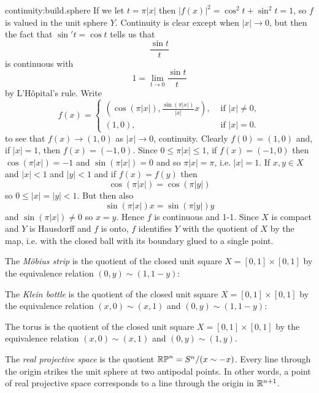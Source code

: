 \begin{answer}{continuity:build.sphere}
  If we let \(t=\pi |x|\) then \(|f(x)|^2=\cos^2 t + \sin^2 t=1\), so \(f\) is valued in the unit sphere \(Y\).
  Continuity is clear except when \(|x| \to 0\), but then the fact that \(\sin' t=\cos t\) tells us that
  \[
  \frac{\sin t}{t} 
  \]
  is continuous with
  \[
  1 = \lim_{t \to 0} \frac{\sin t}{t}
  \]
  by L'Hôpital's rule.
  Write
\[
f(x)=
\begin{cases}
\left(\cos(\pi |x|), \frac{\sin(\pi |x|)}{|x|}x\right), & \text{ if \(|x|\ne 0\)}, \\
(1,0), & \text{ if \(|x|=0\).}
\end{cases}
\]
to see that \(f(x) \to (1,0)\) as \(|x| \to 0\), continuity.
  Clearly \(f(0)=(1,0)\) and, if \(|x|=1\), then \(f(x)=(-1,0)\).
  Since \(0 \le \pi|x| \le 1\),  if \(f(x)=(-1,0)\) then \(\cos(\pi|x|)=-1\) and \(\sin(\pi|x|)=0\) and so \(\pi|x|=\pi\), i.e. \(|x|=1\).
  If \(x, y \in X\) and \(|x|<1\) and \(|y|<1\) and if \(f(x)=f(y)\) then
  \[
  \cos(\pi|x|)=\cos(\pi|y|)
  \]
  so \(0\le |x|=|y| < 1\).
  But then also
  \[
  \sin(\pi|x|)x=\sin(\pi|y|)y
  \]
  and \(\sin(\pi|x|) \ne 0\) so \(x=y\).
  Hence \(f\) is continuous and 1-1.
  Since \(X\) is compact and \(Y\) is Hausdorff and \(f\) is onto, \(f\) identifies \(Y\) with the quotient of \(X\) by the map, i.e. with the closed ball with its boundary glued to a single point.
\end{answer}
\begin{exampleAndImage}{1cm}
The \emph{M\"obius strip} is the quotient of the closed unit square \(X=[0,1] \times [0,1]\) by the equivalence relation \((0,y)\sim(1,1-y)\):
\tcblower

\end{exampleAndImage}
\begin{exampleAndImage}{1cm}
The \emph{Klein bottle} is the quotient of the closed unit square \(X=[0,1] \times [0,1]\) by the equivalence relation \((x,0)\sim(x,1)\) and \((0,y)\sim(1,1-y)\):
\tcblower

\end{exampleAndImage}
\begin{exampleAndImage}{1cm}
The torus is the quotient of the closed unit square \(X=[0,1] \times [0,1]\) by the equivalence relation \((x,0)\sim(x,1)\) and \((0,y)\sim(1,y)\).
\tcblower

\end{exampleAndImage}
\begin{example}
The \emph{real projective space} is the quotient \(\mathbb{RP}^{n}=S^n/(x \sim -x)\).
Every line through the origin strikes the unit sphere at two antipodal points.
In other words, a point of real projective space corresponds to a line through the origin in \(\mathbb{R}^{n+1}\).
\end{example}
